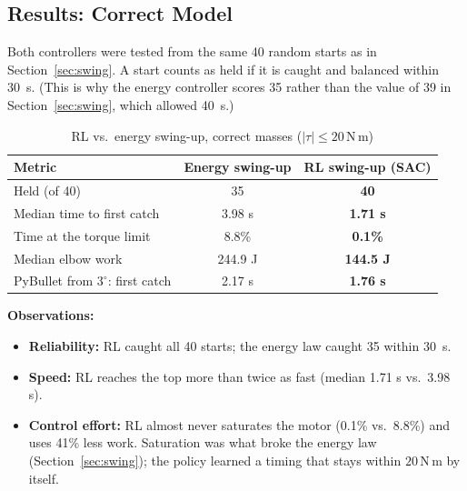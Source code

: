 \documentclass[12pt,a4paper]{article}
\newcommand{\Nm}{\,\mathrm{N\,m}}
\begin{document}
\subsection{Results: Correct Model}
Both controllers were tested from the same 40 random starts as in Section~\ref{sec:swing}. A start counts as held if it is caught and balanced within 30~s. (This is why the energy controller scores 35 rather than the value of 39 in Section~\ref{sec:swing}, which allowed 40~s.)
\begin{table}[H]
\centering
\caption{RL vs.\ energy swing-up, correct masses ($|\tau|\le20\Nm$)}
\label{tab:rlnom}
\begin{tabular}{|l|c|c|}
\hline
Metric & Energy swing-up & RL swing-up (SAC)\\ \hline
Held (of 40) & 35 & \textbf{40}\\
Median time to first catch & 3.98 s & \textbf{1.71 s}\\
Time at the torque limit & 8.8\% & \textbf{0.1\%}\\
Median elbow work & 244.9 J & \textbf{144.5 J}\\
PyBullet from $3^\circ$: first catch & 2.17 s & \textbf{1.76 s}\\ \hline
\end{tabular}
\end{table}
\textbf{Observations:}
\begin{itemize}
\item \textbf{Reliability:} RL caught all 40 starts; the energy law caught 35 within 30~s.
\item \textbf{Speed:} RL reaches the top more than twice as fast (median 1.71 s vs.\ 3.98 s).
\item \textbf{Control effort:} RL almost never saturates the motor (0.1\% vs.\ 8.8\%) and uses 41\% less work. Saturation was what broke the energy law (Section~\ref{sec:swing}); the policy learned a timing that stays within $20\Nm$ by itself.
\end{itemize}
\end{document}
